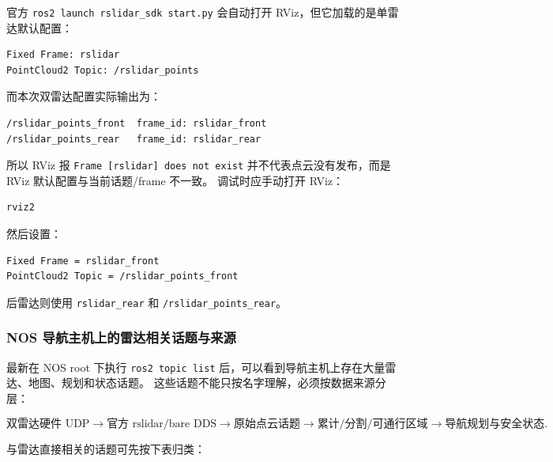 \documentclass[UTF8,11pt,a4paper]{ctexart}
\begin{document}
官方 \texttt{ros2 launch rslidar\_sdk start.py} 会自动打开 RViz，但它加载的是单雷达默认配置：

\begin{verbatim}
Fixed Frame: rslidar
PointCloud2 Topic: /rslidar_points
\end{verbatim}

而本次双雷达配置实际输出为：

\begin{verbatim}
/rslidar_points_front  frame_id: rslidar_front
/rslidar_points_rear   frame_id: rslidar_rear
\end{verbatim}

所以 RViz 报 \texttt{Frame [rslidar] does not exist} 并不代表点云没有发布，而是 RViz 默认配置与当前话题/frame 不一致。
调试时应手动打开 RViz：

\begin{verbatim}
rviz2
\end{verbatim}

然后设置：

\begin{verbatim}
Fixed Frame = rslidar_front
PointCloud2 Topic = /rslidar_points_front
\end{verbatim}

后雷达则使用 \texttt{rslidar\_rear} 和 \texttt{/rslidar\_points\_rear}。

\subsubsection{NOS 导航主机上的雷达相关话题与来源}

最新在 NOS root 下执行 \texttt{ros2 topic list} 后，可以看到导航主机上存在大量雷达、地图、规划和状态话题。
这些话题不能只按名字理解，必须按数据来源分层：

\[
\text{双雷达硬件 UDP}
\rightarrow
\text{官方 rslidar/bare DDS}
\rightarrow
\text{原始点云话题}
\rightarrow
\text{累计/分割/可通行区域}
\rightarrow
\text{导航规划与安全状态}.
\]

与雷达直接相关的话题可先按下表归类：
\end{document}
